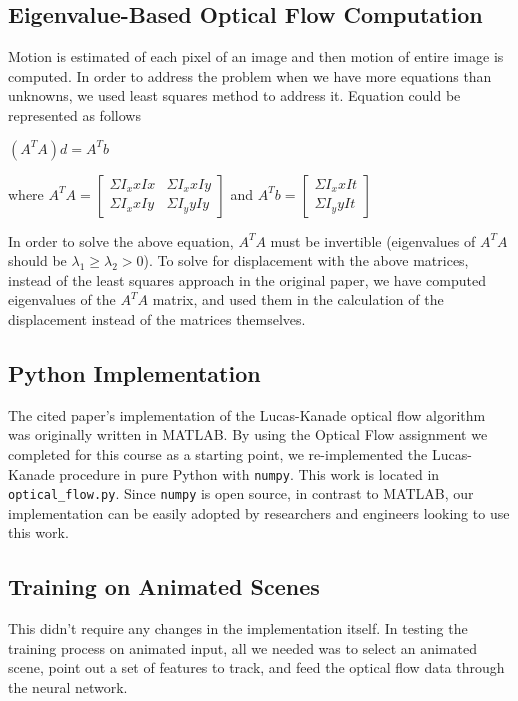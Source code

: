 \subsection{Eigenvalue-Based Optical Flow Computation}\label{subsec:eigenvalue-based-optical-flow-computation}
Motion is estimated of each pixel of an image and then motion of entire image is computed.
In order to address the problem when we have more equations than unknowns, we used least squares method to address it.
Equation could be represented as follows
\begin{center}
    $(A^T A) d = A^T b$
\end{center}
\setlength{\parskip}{10pt plus 1pt minus 1pt}
where  $ A^T A =  \begin{bmatrix}
                      \Sigma I_x{xI}x & \Sigma I_x{xI}y \\
                      \Sigma I_x{xI}y & \Sigma I_y{yI}y
\end{bmatrix} $  and $A^T b = \begin{bmatrix}
                                  \Sigma I_x{xI}t \\
                                  \Sigma I_y{yI}t
\end{bmatrix}$
\setlength{\parskip}{10pt plus 1pt minus 1pt}

In order to solve the above equation, $A^T A$ must be invertible (eigenvalues of $A^T A$ should be $\lambda_1 \geq \lambda_2 > 0$).
To solve for displacement with the above matrices, instead of the least squares approach in the original paper, we have computed eigenvalues of the $A^T A$ matrix, and used them in the calculation of the displacement instead of the matrices themselves.

\subsection{Python Implementation}\label{subsec:python-implementation}
The cited paper's implementation of the Lucas-Kanade optical flow algorithm was originally written in MATLAB\@.
By using the Optical Flow assignment we completed for this course as a starting point, we re-implemented the Lucas-Kanade procedure in pure Python with \texttt{numpy}.
This work is located in \verb|optical_flow.py|.
Since \texttt{numpy} is open source, in contrast to MATLAB, our implementation can be easily adopted by researchers and engineers looking to use this work.

\subsection{Training on Animated Scenes}\label{subsec:training-on-animated-scenes}
This didn't require any changes in the implementation itself.
In testing the training process on animated input, all we needed was to select an animated scene, point out a set of features to track, and feed the optical flow data through the neural network.